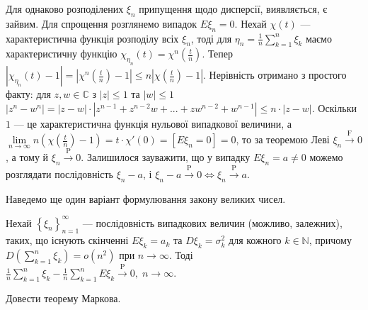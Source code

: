 \begin{remark}
    Для однаково розподілених $\xi_n$ припущення щодо дисперсії, виявляється, є зайвим. Для спрощення розглянемо випадок $E\xi_n = 0$.
    Нехай $\chi(t)$ --- характеристична функція розподілу всіх $\xi_n$, тоді для $\eta_n = \frac{1}{n}\sum\limits_{k=1}^n \xi_k$ 
    маємо характеристичну функцію $\chi_{\eta_n} (t) = \chi^n \left(\frac{t}{n}\right)$. 
    Тепер $\left| \chi_{\eta_n} (t) - 1\right| = \left| \chi^n \left(\frac{t}{n}\right) - 1\right| \leq n \left| \chi \left(\frac{t}{n}\right) - 1\right|$.
    Нерівність отримано з простого факту: для $z, w \in \mathbb{C}$ з $|z| \leq 1$ та $|w|\leq 1$
    $\left|z^n - w^n\right| = \left|z - w\right| \cdot \left|z^{n-1} + z^{n-2}w + ... + z w^{n-2} + w^{n-1}\right| \leq n \cdot \left|z - w\right|$.
    Оскільки $1$ --- це характеристична функція нульової випадкової величини, а \\
    \noindent$ \underset{n \to \infty}{\lim} n \left(\chi(\frac{t}{n}) - 1\right) = t \cdot \chi'(0) = \left[ E\xi_n = 0\right]=0$,
    то за теоремою Леві $\xi_n \overset{\mathrm{F}}{\longrightarrow} 0$, а тому й $\xi_n \overset{\mathrm{P}}{\longrightarrow} 0$. Залишилося зауважити, що у випадку
    $E\xi_n = a \neq 0$ можемо розглядати послідовність $\xi_n - a$, і $\xi_n - a \overset{\mathrm{P}}{\longrightarrow} 0 \Leftrightarrow \xi_n \overset{\mathrm{P}}{\longrightarrow} a$. 
\end{remark}
Наведемо ще один варіант формулювання закону великих чисел.
\begin{theorem*}
    Нехай $\left\{ \xi_n\right\}_{n=1}^{\infty}$ --- послідовність випадкових величин (можливо, залежних), 
    таких, що існують скінченні $E\xi_k = a_k$ та $D\xi_k = \sigma_k^2$ для кожного $k \in \mathbb{N}$,
    причому $D \left( \sum\limits_{k=1}^n \xi_k\right) = o(n^2)$ при $n\to\infty$.
    Тоді
    $
        \frac{1}{n}\sum\limits_{k=1}^n \xi_k - \frac{1}{n}\sum\limits_{k=1}^n E\xi_k \overset{\mathrm{P}}{\longrightarrow} 0, \; n \to \infty
    $.
\end{theorem*}
\begin{exercise}
    Довести теорему Маркова.
\end{exercise}
